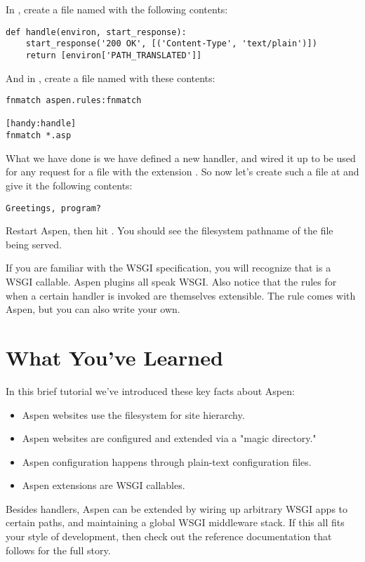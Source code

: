 In , create a file named  with the
following contents:

\begin{verbatim}
def handle(environ, start_response):
    start_response('200 OK', [('Content-Type', 'text/plain')])
    return [environ['PATH_TRANSLATED']]
\end{verbatim}

And in , create a file named  with these
contents:

\begin{verbatim}
fnmatch aspen.rules:fnmatch

[handy:handle]
fnmatch *.asp
\end{verbatim}

What we have done is we have defined a new handler, and wired it up to be used
for any request for a file with the extension . So now let's create
such a file at  and give it the following contents:

\begin{verbatim}
Greetings, program?
\end{verbatim}

Restart Aspen, then hit . You should see
the filesystem pathname of the file being served.

If you are familiar with the WSGI specification, you will recognize that
 is a WSGI callable. Aspen plugins all speak WSGI. Also
notice that the rules for when a certain handler is invoked are themselves
extensible. The  rule comes with Aspen, but you can also write
your own.


\section{What You've Learned \label{tutorial-learned}}

In this brief tutorial we've introduced these key facts about Aspen:

\begin{itemize}
\item{Aspen websites use the filesystem for site hierarchy.}
\item{Aspen websites are configured and extended via a "magic directory."}
\item{Aspen configuration happens through plain-text configuration files.}
\item{Aspen extensions are WSGI callables.}
\end{itemize}

Besides handlers, Aspen can be extended by wiring up arbitrary WSGI apps to
certain paths, and maintaining a global WSGI middleware stack. If this all fits
your style of development, then check out the reference documentation that
follows for the full story.

